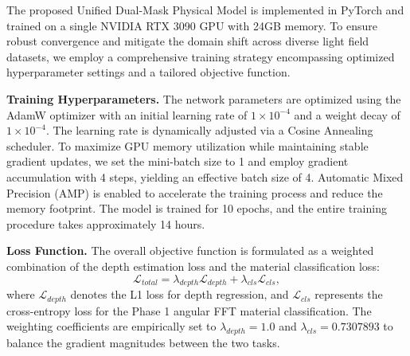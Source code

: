 \documentclass[lettersize,journal]{IEEEtran}
\begin{document}
\begin{table}[t]
\centering
\caption{Summary of the Light Field Datasets Used for Training and Evaluation}
\label{tab:datasets}
\end{table}

The proposed Unified Dual-Mask Physical Model is implemented in PyTorch and trained on a single NVIDIA RTX 3090 GPU with 24GB memory. To ensure robust convergence and mitigate the domain shift across diverse light field datasets, we employ a comprehensive training strategy encompassing optimized hyperparameter settings and a tailored objective function.

\textbf{Training Hyperparameters.} 
The network parameters are optimized using the AdamW optimizer with an initial learning rate of $1 \times 10^{-4}$ and a weight decay of $1 \times 10^{-4}$. The learning rate is dynamically adjusted via a Cosine Annealing scheduler. To maximize GPU memory utilization while maintaining stable gradient updates, we set the mini-batch size to 1 and employ gradient accumulation with 4 steps, yielding an effective batch size of 4. Automatic Mixed Precision (AMP) is enabled to accelerate the training process and reduce the memory footprint. The model is trained for 10 epochs, and the entire training procedure takes approximately 14 hours. 

\textbf{Loss Function.} 
The overall objective function is formulated as a weighted combination of the depth estimation loss and the material classification loss:
\begin{equation}
\mathcal{L}_{total} = \lambda_{depth} \mathcal{L}_{depth} + \lambda_{cls} \mathcal{L}_{cls},
\end{equation}
where $\mathcal{L}_{depth}$ denotes the L1 loss for depth regression, and $\mathcal{L}_{cls}$ represents the cross-entropy loss for the Phase 1 angular FFT material classification. The weighting coefficients are empirically set to $\lambda_{depth} = 1.0$ and $\lambda_{cls} = 0.7307893$ to balance the gradient magnitudes between the two tasks.
\end{document}
